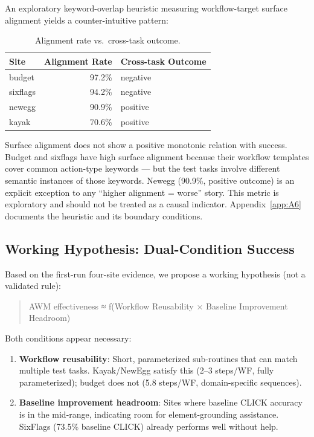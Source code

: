 \documentclass{article}
\providecommand{\tightlist}{%
  \setlength{\itemsep}{0pt}\setlength{\parskip}{0.8em}}
\begin{document}
An exploratory keyword-overlap heuristic measuring workflow-target
surface alignment yields a counter-intuitive pattern:

{\begin{longtable}[]{@{}lrl@{}}
\caption{Alignment rate vs.~cross-task outcome.}\label{tab:alignment-rate-vs-cross-task-outcome}\\

\toprule\noalign{}
Site & Alignment Rate & Cross-task Outcome \\
\midrule\noalign{}
\endhead
\bottomrule\noalign{}
\endlastfoot
budget & 97.2\% & negative \\
sixflags & 94.2\% & negative \\
newegg & 90.9\% & positive \\
kayak & 70.6\% & positive \\
\end{longtable}
}

Surface alignment does not show a positive monotonic relation with
success. Budget and sixflags have high surface alignment because their
workflow templates cover common action-type keywords --- but the test
tasks involve different semantic instances of those keywords. Newegg
(90.9\%, positive outcome) is an explicit exception to any ``higher alignment
= worse'' story. This metric is exploratory and should not be treated as
a causal indicator. Appendix~\ref{app:A6} documents the heuristic and
its boundary conditions.

\subsection{Working Hypothesis: Dual-Condition
Success}\label{working-hypothesis-dual-condition-success}

Based on the first-run four-site evidence, we propose a working
hypothesis (not a validated rule):

\begin{quote}
AWM effectiveness ≈ f(Workflow Reusability × Baseline Improvement
Headroom)
\end{quote}

Both conditions appear necessary:

\begin{enumerate}
\def\labelenumi{\arabic{enumi}.}
\tightlist
\item
  \textbf{Workflow reusability}: Short, parameterized sub-routines that
  can match multiple test tasks. Kayak/NewEgg satisfy this (2--3
  steps/WF, fully parameterized); budget does not (5.8 steps/WF,
  domain-specific sequences).
\item
  \textbf{Baseline improvement headroom}: Sites where baseline CLICK
  accuracy is in the mid-range, indicating room for element-grounding
  assistance. SixFlags (73.5\% baseline CLICK) already performs well
  without help.
\end{enumerate}
\end{document}
